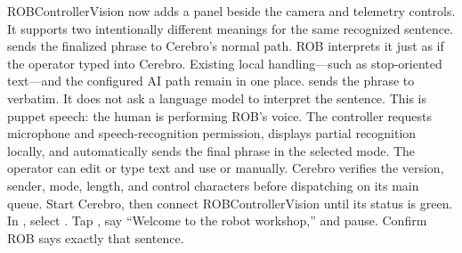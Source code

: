 {}ROBControllerVision now adds a  panel beside the\markdownRendererSoftLineBreak
{}camera and telemetry controls. It supports two intentionally different\markdownRendererSoftLineBreak
{}meanings for the same recognized sentence.\markdownRendererParagraphSeparator
{} sends the finalized phrase to Cerebro's normal  path.\markdownRendererSoftLineBreak
{}ROB interprets it just as if the operator typed into Cerebro. Existing local\markdownRendererSoftLineBreak
{}handling—such as stop-oriented text—and the configured AI path remain in one\markdownRendererSoftLineBreak
{}place.\markdownRendererParagraphSeparator
{} sends the phrase to  verbatim. It does not ask a\markdownRendererSoftLineBreak
{}language model to interpret the sentence. This is puppet speech: the human is\markdownRendererSoftLineBreak
{}performing ROB's voice.\markdownRendererInterblockSeparator
{}\markdownRendererInterblockSeparator
{}The controller requests microphone and speech-recognition permission, displays\markdownRendererSoftLineBreak
{}partial recognition locally, and automatically sends the final phrase in the\markdownRendererSoftLineBreak
{}selected mode. The operator can edit or type text and use  or\markdownRendererSoftLineBreak
{} manually. Cerebro verifies the version, sender, mode, length,\markdownRendererSoftLineBreak
{}and control characters before dispatching on its main queue.\markdownRendererInterblockSeparator
{}\markdownRendererSectionBegin
{}\markdownRendererInterblockSeparator
{}\markdownRendererOlBegin
{}Start Cerebro, then connect ROBControllerVision until its status is green.\markdownRendererOlItemEnd 
{}In , select .\markdownRendererOlItemEnd 
{}Tap , say “Welcome to the robot workshop,” and pause. Confirm ROB\markdownRendererSoftLineBreak
{}says exactly that sentence.\markdownRendererOlItemEnd 
